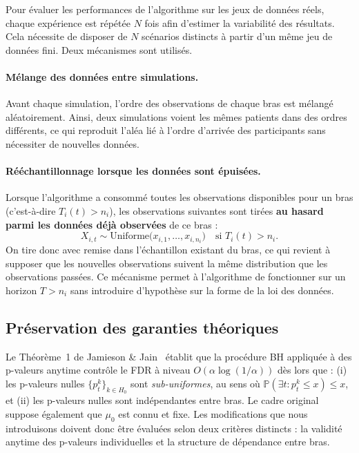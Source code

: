 \documentclass[10.5pt,a4paper]{article}
\begin{document}
Pour évaluer les performances de l'algorithme sur les jeux de données
réels, chaque expérience est répétée $N$ fois afin d'estimer la variabilité
des résultats. Cela nécessite de disposer de $N$ scénarios distincts à
partir d'un même jeu de données fini. Deux mécanismes sont utilisés.

\paragraph{Mélange des données entre simulations.}
Avant chaque simulation, l'ordre des observations de chaque bras est
mélangé aléatoirement. Ainsi, deux simulations voient les mêmes patients
dans des ordres différents, ce qui reproduit l'aléa lié à l'ordre
d'arrivée des participants sans nécessiter de nouvelles données.

\paragraph{Rééchantillonnage lorsque les données sont épuisées.}
Lorsque l'algorithme a consommé toutes les observations disponibles pour
un bras (c'est-à-dire $T_i(t) > n_i$), les observations suivantes sont
tirées \textbf{au hasard parmi les données déjà observées} de ce bras :
\[
  X_{i,t} \sim \mathrm{Uniforme}\bigl(x_{i,1}, \ldots, x_{i,n_i}\bigr)
  \quad \text{si } T_i(t) > n_i.
\]
On tire donc avec remise dans l'échantillon existant du bras, ce qui
revient à supposer que les nouvelles observations suivent la même
distribution que les observations passées. Ce mécanisme permet à
l'algorithme de fonctionner sur un horizon $T > n_i$ sans introduire
d'hypothèse sur la forme de la loi des données.

\subsection{Pr\'eservation des garanties th\'eoriques}

Le Théorème~1 de Jamieson \& Jain~\cite{jamieson2019} établit que la
procédure BH appliquée à des p-valeurs anytime contrôle le FDR à niveau
$O(\alpha\log(1/\alpha))$ dès lors que : (i) les p-valeurs nulles
$\{p_t^k\}_{k\in H_0}$ sont \emph{sub-uniformes}, au sens où
$\mathbb{P}(\exists t : p_t^k \leq x) \leq x$, et (ii) les p-valeurs nulles
sont indépendantes entre bras. Le cadre original suppose également que
$\mu_0$ est connu et fixe. Les modifications que nous introduisons doivent
donc être évaluées selon deux critères distincts : la validité anytime des
p-valeurs individuelles et la structure de dépendance entre bras.
\end{document}
